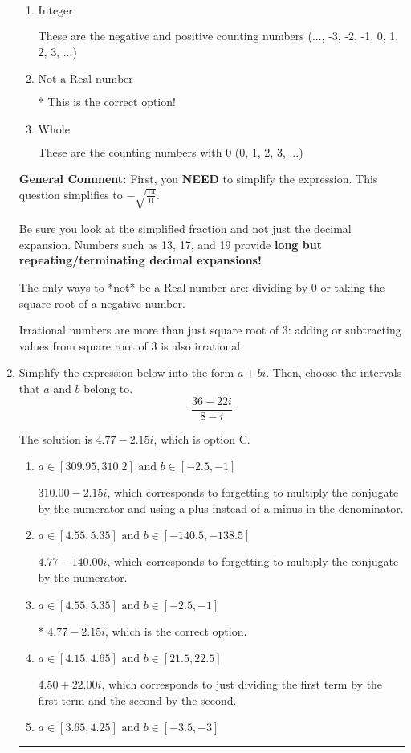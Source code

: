 \documentclass{extbook}[14pt]
\newcommand{\litem}[1]{\item #1

\rule{\textwidth}{0.4pt}}
\begin{document}
\begin{enumerate}
{\begin{enumerate}[label=\Alph*.]
These cannot be written as a fraction of Integers.
\item \( \text{Integer} \)

These are the negative and positive counting numbers (..., -3, -2, -1, 0, 1, 2, 3, ...)
\item \( \text{Not a Real number} \)

* This is the correct option!
\item \( \text{Whole} \)

These are the counting numbers with 0 (0, 1, 2, 3, ...)
\end{enumerate}

\textbf{General Comment:} First, you \textbf{NEED} to simplify the expression. This question simplifies to $-\sqrt{\frac{14}{0}}$. 
 
 Be sure you look at the simplified fraction and not just the decimal expansion. Numbers such as 13, 17, and 19 provide \textbf{long but repeating/terminating decimal expansions!} 
 
 The only ways to *not* be a Real number are: dividing by 0 or taking the square root of a negative number. 
 
 Irrational numbers are more than just square root of 3: adding or subtracting values from square root of 3 is also irrational.
}
\litem{
Simplify the expression below into the form $a+bi$. Then, choose the intervals that $a$ and $b$ belong to.
\[ \frac{36 - 22 i}{8 - i} \]

The solution is \( 4.77  - 2.15 i \), which is option C.\begin{enumerate}[label=\Alph*.]
\item \( a \in [309.95, 310.2] \text{ and } b \in [-2.5, -1] \)

 $310.00  - 2.15 i$, which corresponds to forgetting to multiply the conjugate by the numerator and using a plus instead of a minus in the denominator.
\item \( a \in [4.55, 5.35] \text{ and } b \in [-140.5, -138.5] \)

 $4.77  - 140.00 i$, which corresponds to forgetting to multiply the conjugate by the numerator.
\item \( a \in [4.55, 5.35] \text{ and } b \in [-2.5, -1] \)

* $4.77  - 2.15 i$, which is the correct option.
\item \( a \in [4.15, 4.65] \text{ and } b \in [21.5, 22.5] \)

 $4.50  + 22.00 i$, which corresponds to just dividing the first term by the first term and the second by the second.
\item \( a \in [3.65, 4.25] \text{ and } b \in [-3.5, -3] \)


\end{enumerate}}
\end{enumerate}
\end{document}

